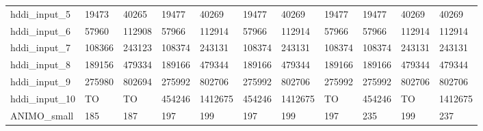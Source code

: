 \begin{table}
\begin{adjustbox}{max totalheight=\textheight}
\begin{tabular}{|l|llllllllll|}
    hddi\_input\_5     & 19473    & 40265    & 19477    & 40269    & 19477    & 40269    & 19477    & 19477    & 40269    & 40269    \\
    hddi\_input\_6     & 57960    & 112908   & 57966    & 112914   & 57966    & 112914   & 57966    & 57966    & 112914   & 112914   \\
    hddi\_input\_7     & 108366   & 243123   & 108374   & 243131   & 108374   & 243131   & 108374   & 108374   & 243131   & 243131   \\
    hddi\_input\_8     & 189156   & 479334   & 189166   & 479344   & 189166   & 479344   & 189166   & 189166   & 479344   & 479344   \\
    hddi\_input\_9     & 275980   & 802694   & 275992   & 802706   & 275992   & 802706   & 275992   & 275992   & 802706   & 802706   \\
    hddi\_input\_10    & TO       & TO       & 454246   & 1412675  & 454246   & 1412675  & TO       & 454246   & TO       & 1412675  \\ \hline
    ANIMO\_small       & 185      & 187      & 197      & 199      & 197      & 199      & 197      & 235      & 199      & 237      \\ \hline
    \end{tabular}
\end{adjustbox}
\end{table}